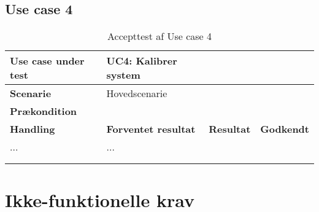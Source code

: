 \newpage

\subsection{Use case 4}
\begin{longtabu} to 
\midrule
\textbf{Use case under test} & UC4: Kalibrer system \\
\midrule
\textbf{Scenarie} & Hovedscenarie\\
\midrule
\textbf{Prækondition} & \\
\midrule
\textbf{Handling} &    \textbf{Forventet resultat} & \textbf{Resultat}	&    \textbf{Godkendt}\\[-1ex]
    \midrule
   ... &    ... &    \\
   \midrule
\caption{Accepttest af Use case 4}\\
\label{AT_UC4}
\end{longtabu}

\newpage

\section{Ikke-funktionelle krav}

